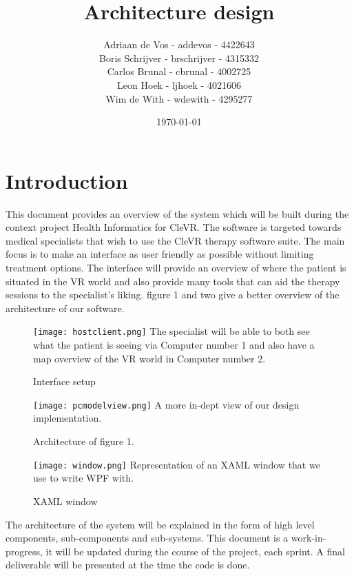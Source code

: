 \documentclass[11pt]{article}
\begin{document}
\title{Architecture design}
\author{
	Adriaan de Vos - addevos - 4422643\\
	Boris Schrijver - brschrijver - 4315332\\
	Carlos Brunal - cbrunal - 4002725\\
	Leon Hoek - ljhoek - 4021606\\
	Wim de With - wdewith - 4295277
}
\date{\today}

\maketitle

\newpage
\tableofcontents
\newpage

\section{Introduction}
This document provides an overview of the system which will be built during the context project Health Informatics for \gls{CleVR}.
\newline
The software is targeted towards medical specialists that wish to use the CleVR therapy software suite. The main focus is to make an interface as user friendly as possible without limiting treatment options. The interface will provide an overview of where the patient is situated in the VR world and also provide many tools that can aid the therapy sessions to the specialist's liking. figure 1 and two give a better overview of the architecture of our software.

\begin{figure}[H]
	\caption{Interface setup}
	\texttt{[image: hostclient.png]}
    The specialist will be able to both see what the patient is seeing via Computer number 1 and also have a map overview of the VR world in Computer number 2.
\end{figure}

\begin{figure}[H]
	\caption{Architecture of figure 1.}
	\texttt{[image: pcmodelview.png]}
    A more in-dept view of our design implementation.
\end{figure}

\begin{figure}[H]
	\caption{XAML window}
	\texttt{[image: window.png]}
    Representation of an XAML window that we use to write WPF with.
\end{figure}

 The architecture of the system will be explained in the form of high level components, sub-components and sub-systems. This document is a work-in-progress, it will be updated during the course of the project, each sprint. A final deliverable will be presented at the time the code is done.
\end{document}
